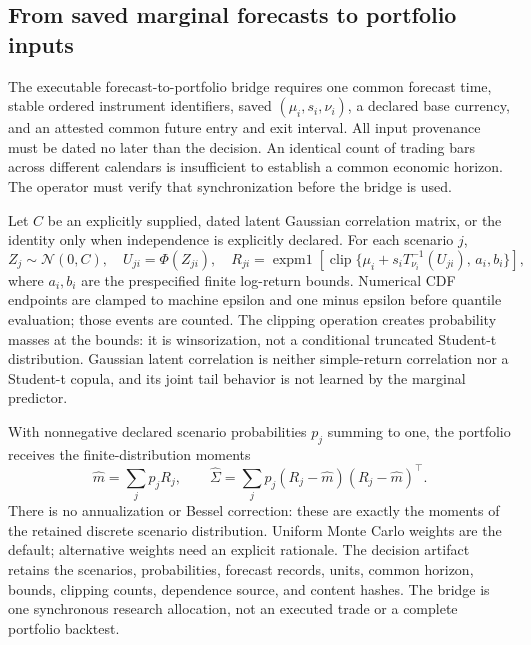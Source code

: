 \documentclass[11pt,a4paper]{article}
\newcommand{\clip}{\operatorname{clip}}
\begin{document}
\subsection{From saved marginal forecasts to portfolio inputs}

The executable forecast-to-portfolio bridge requires one common forecast time, stable ordered instrument identifiers, saved $(\mu_i,s_i,\nu_i)$, a declared base currency, and an attested common future entry and exit interval. All input provenance must be dated no later than the decision. An identical count of trading bars across different calendars is insufficient to establish a common economic horizon. The operator must verify that synchronization before the bridge is used.

Let $C$ be an explicitly supplied, dated latent Gaussian correlation matrix, or the identity only when independence is explicitly declared. For each scenario $j$,
\begin{equation}
Z_j\sim\mathcal N(0,C),\quad U_{ji}=\Phi(Z_{ji}),\quad
R_{ji}=\operatorname{expm1}\left[\clip\{\mu_i+s_iT_{\nu_i}^{-1}(U_{ji}),\,a_i,b_i\}\right],
\end{equation}
where $a_i,b_i$ are the prespecified finite log-return bounds. Numerical CDF endpoints are clamped to machine epsilon and one minus epsilon before quantile evaluation; those events are counted. The clipping operation creates probability masses at the bounds: it is winsorization, not a conditional truncated Student-t distribution. Gaussian latent correlation is neither simple-return correlation nor a Student-t copula, and its joint tail behavior is not learned by the marginal predictor.

With nonnegative declared scenario probabilities $p_j$ summing to one, the portfolio receives the finite-distribution moments
\begin{equation}
\widehat m=\sum_jp_jR_j,\qquad
\widehat\Sigma=\sum_jp_j(R_j-\widehat m)(R_j-\widehat m)^\top.
\end{equation}
There is no annualization or Bessel correction: these are exactly the moments of the retained discrete scenario distribution. Uniform Monte Carlo weights are the default; alternative weights need an explicit rationale. The decision artifact retains the scenarios, probabilities, forecast records, units, common horizon, bounds, clipping counts, dependence source, and content hashes. The bridge is one synchronous research allocation, not an executed trade or a complete portfolio backtest.
\end{document}
